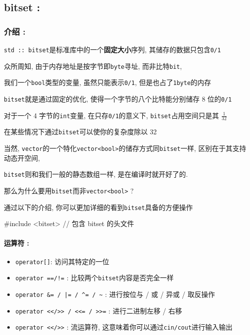 
\subsection{bitset :}

\subsubsection{介绍 :}

\texttt{std :: bitset}是标准库中的一个\textbf{固定大小}序列, 其储存的数据只包含\texttt{0/1}

众所周知, 由于内存地址是按字节即\texttt{byte}寻址, 而非比特\texttt{bit}, 

我们一个\texttt{bool}类型的变量, 虽然只能表示\texttt{0/1}, 但是也占了\texttt{1byte}的内存

\texttt{bitset}就是通过固定的优化, 使得一个字节的八个比特能分别储存 8 位的\texttt{0/1}

对于一个 4 字节的\texttt{int}变量, 在只存\texttt{0/1}的意义下, \texttt{bitset}占用空间只是其 $\frac{1}{32}$

在某些情况下通过\texttt{bitset}可以使你的复杂度除以 32

当然, \texttt{vector}的一个特化\texttt{vector<bool>}的储存方式同\texttt{bitset}一样, 区别在于其支持动态开空间, 

\texttt{bitset}则和我们一般的静态数组一样, 是在编译时就开好了的.

那么为什么要用\texttt{bitset}而非\texttt{vector<bool>} ?

通过以下的介绍, 你可以更加详细的看到\texttt{bitset}具备的方便操作

\begin{cppcode}
#include <bitset>  // 包含 bitset 的头文件
\end{cppcode}

\paragraph{运算符 :}

\begin{itemize}
\item \texttt{operator[]}: 访问其特定的一位
\item \texttt{operator ==/!=} : 比较两个\texttt{bitset}内容是否完全一样
\item \texttt{operator \&= / |= / \textasciicircum{}= / \textasciitilde{}} : 进行按位与 / 或 / 异或 / 取反操作
\item \texttt{operator <</>> / <<= / >>=} : 进行二进制左移 / 右移
\item \texttt{operator <</>>} : 流运算符, 这意味着你可以通过\texttt{cin/cout}进行输入输出
\end{itemize}

